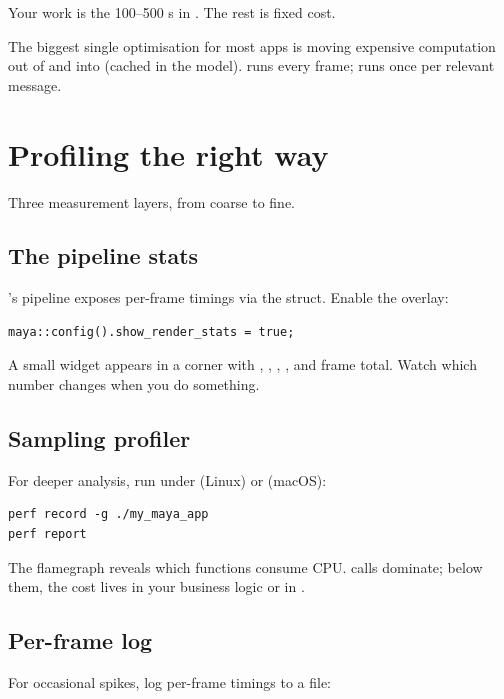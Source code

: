 Your work is the 100--500 \textmu s in . The rest is
fixed cost.

\begin{idea}
The biggest single optimisation for most apps is moving
expensive computation out of  and into 
(cached in the model).  runs every frame; 
runs once per relevant message.
\end{idea}

\section{Profiling the right way}

Three measurement layers, from coarse to fine.

\subsection*{The pipeline stats}

\maya{}'s pipeline exposes per-frame timings via the 
struct. Enable the overlay:

\begin{lstlisting}
maya::config().show_render_stats = true;
\end{lstlisting}

A small widget appears in a corner with ,
, , ,
and frame total. Watch which number changes when you do
something.

\subsection*{Sampling profiler}

For deeper analysis, run under  (Linux) or
 (macOS):

\begin{lstlisting}
perf record -g ./my_maya_app
perf report
\end{lstlisting}

The flamegraph reveals which functions consume CPU. 
calls dominate; below them, the cost lives in your business
logic or in .

\subsection*{Per-frame log}

For occasional spikes, log per-frame timings to a file:


